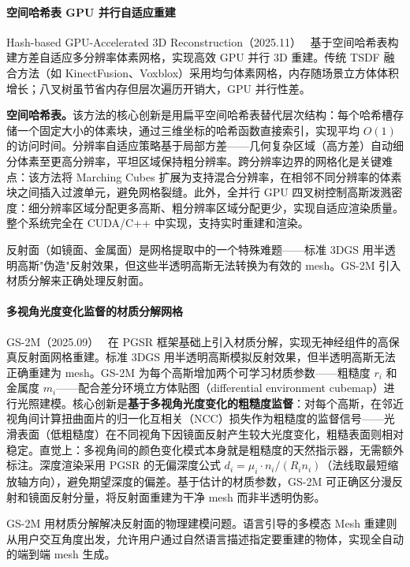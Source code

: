 \paragraph{空间哈希表 GPU 并行自适应重建}

Hash-based GPU-Accelerated 3D Reconstruction（2025.11）~\cite{2511_21459} 基于空间哈希表构建方差自适应多分辨率体素网格，实现高效 GPU 并行 3D 重建。传统 TSDF 融合方法（如 KinectFusion、Voxblox）采用均匀体素网格，内存随场景立方体体积增长；八叉树虽节省内存但层次遍历开销大，GPU 并行性差。

\textbf{空间哈希表。}该方法的核心创新是用扁平空间哈希表替代层次结构：每个哈希槽存储一个固定大小的体素块，通过三维坐标的哈希函数直接索引，实现平均 $O(1)$ 的访问时间。分辨率自适应策略基于局部方差——几何复杂区域（高方差）自动细分体素至更高分辨率，平坦区域保持粗分辨率。跨分辨率边界的网格化是关键难点：该方法将 Marching Cubes 扩展为支持混合分辨率，在相邻不同分辨率的体素块之间插入过渡单元，避免网格裂缝。此外，全并行 GPU 四叉树控制高斯泼溅密度：细分辨率区域分配更多高斯、粗分辨率区域分配更少，实现自适应渲染质量。整个系统完全在 CUDA/C++ 中实现，支持实时重建和渲染。

反射面（如镜面、金属面）是网格提取中的一个特殊难题——标准 3DGS 用半透明高斯"伪造"反射效果，但这些半透明高斯无法转换为有效的 mesh。GS-2M 引入材质分解来正确处理反射面。

\paragraph{多视角光度变化监督的材质分解网格}

GS-2M（2025.09）~\cite{2509_22276} 在 PGSR 框架基础上引入材质分解，实现无神经组件的高保真反射面网格重建。标准 3DGS 用半透明高斯模拟反射效果，但半透明高斯无法正确重建为 mesh。GS-2M 为每个高斯增加两个可学习材质参数——粗糙度 $r_i$ 和金属度 $m_i$——配合差分环境立方体贴图（differential environment cubemap）进行光照建模。核心创新是\textbf{基于多视角光度变化的粗糙度监督}：对每个高斯，在邻近视角间计算扭曲面片的归一化互相关（NCC）损失作为粗糙度的监督信号——光滑表面（低粗糙度）在不同视角下因镜面反射产生较大光度变化，粗糙表面则相对稳定。直觉上：多视角间的颜色变化模式本身就是粗糙度的天然指示器，无需额外标注。深度渲染采用 PGSR 的无偏深度公式 $d_i = \mu_i \cdot n_i / (R_i n_i)$（法线取最短缩放轴方向），避免期望深度的偏差。基于估计的材质参数，GS-2M 可正确区分漫反射和镜面反射分量，将反射面重建为干净 mesh 而非半透明伪影。

GS-2M 用材质分解解决反射面的物理建模问题。语言引导的多模态 Mesh 重建则从用户交互角度出发，允许用户通过自然语言描述指定要重建的物体，实现全自动的端到端 mesh 生成。

